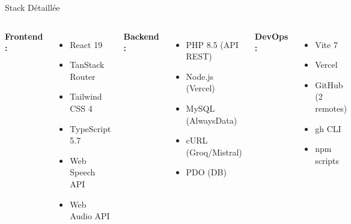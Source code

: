 \documentclass[11pt,aspectratio=169]{beamer}
\begin{document}
\begin{frame}{Stack D\'etaill\'ee}
  \begin{columns}
    \textbf{\textcolor{ferrariRed}{Frontend :}} \\[0.1cm]
    \begin{itemize}
      \item React 19
      \item TanStack Router
      \item Tailwind CSS 4
      \item TypeScript 5.7
      \item Web Speech API
      \item Web Audio API
    \end{itemize}

    \textbf{\textcolor{ferrariRed}{Backend :}} \\[0.1cm]
    \begin{itemize}
      \item PHP 8.5 (API REST)
      \item Node.js (Vercel)
      \item MySQL (AlwaysData)
      \item cURL (Groq/Mistral)
      \item PDO (DB)
    \end{itemize}

    \textbf{\textcolor{ferrariRed}{DevOps :}} \\[0.1cm]
    \begin{itemize}
      \item Vite 7
      \item Vercel
      \item GitHub (2 remotes)
      \item gh CLI
      \item npm scripts
    \end{itemize}
  \end{columns}
\end{frame}
\end{document}
